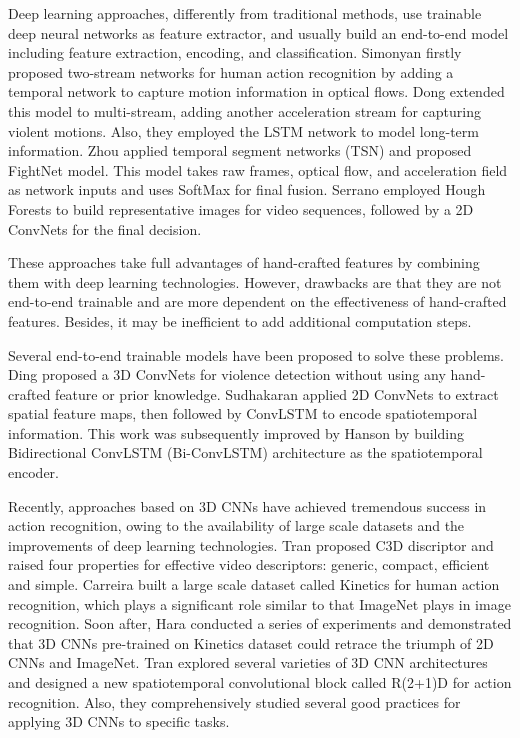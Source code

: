 \documentclass[10pt,twocolumn,letterpaper]{article}
\begin{document}
Deep learning approaches, differently from traditional methods, use trainable deep neural networks as feature extractor, and usually build an end-to-end model including feature extraction, encoding, and classification. 
Simonyan \etal \cite{two-stream} firstly proposed two-stream networks for human action recognition by adding a temporal network to capture motion information in optical flows.
Dong \etal \cite{dong2016multi} extended this model to multi-stream, adding another acceleration stream for capturing violent motions. Also, they employed the LSTM \cite{lstm} network to model long-term information.  
Zhou \etal \cite{zhou2017violent} applied temporal segment networks (TSN) \cite{tsn} and proposed FightNet model. This model takes raw frames, optical flow, and acceleration field as network inputs and uses SoftMax for final fusion.
Serrano \etal \cite{serrano2018fight} employed Hough Forests to build representative images for video sequences, followed by a 2D ConvNets for the final decision.

These approaches take full advantages of hand-crafted features by combining them with deep learning technologies.
However, drawbacks are that they are not end-to-end trainable and are more dependent on the effectiveness of hand-crafted features.
Besides, it may be inefficient to add additional computation steps. 

Several end-to-end trainable models have been proposed to solve these problems.
Ding \etal \cite{3dcnn_ding} proposed a 3D ConvNets for violence detection without using any hand-crafted feature or prior knowledge. 
Sudhakaran \etal \cite{convlstm_sudh} applied 2D ConvNets to extract spatial feature maps, then followed by ConvLSTM \cite{convlstm} to encode spatiotemporal information.
This work was subsequently improved by Hanson \etal \cite{bi_convlstm} by building Bidirectional ConvLSTM (Bi-ConvLSTM) architecture as the spatiotemporal encoder.

Recently, approaches based on 3D CNNs have achieved tremendous success in action recognition, owing to the availability of large scale datasets and the improvements of deep learning technologies. 
Tran \etal \cite{3dcnn_1} proposed C3D discriptor and raised four properties for effective video descriptors: generic, compact, efficient and simple. 
Carreira \etal \cite{kinetics} built a large scale dataset called Kinetics for human action recognition, which plays a significant role similar to that ImageNet \cite{imagenet} plays in image recognition. 
Soon after, Hara \etal \cite{3dcnn_2} conducted a series of experiments and demonstrated that 3D CNNs pre-trained on Kinetics dataset could retrace the triumph of 2D CNNs and ImageNet.
Tran \etal \cite{r2+1d} explored several varieties of 3D CNN architectures and designed a new spatiotemporal convolutional block called R(2+1)D for action recognition.
Also, they comprehensively studied several good practices for applying 3D CNNs to specific tasks.
\end{document}
